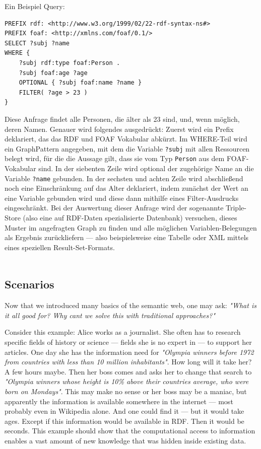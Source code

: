 Ein Beispiel Query:
\begin{lstlisting}[style=sparql]
PREFIX rdf: <http://www.w3.org/1999/02/22-rdf-syntax-ns#>
PREFIX foaf: <http://xmlns.com/foaf/0.1/>
SELECT ?subj ?name
WHERE {
    ?subj rdf:type foaf:Person .
    ?subj foaf:age ?age
    OPTIONAL { ?subj foaf:name ?name }
    FILTER( ?age > 23 )
}
\end{lstlisting}
Diese Anfrage findet alle Personen, die älter als 23 sind, und, wenn möglich, deren Namen. Genauer wird folgendes ausgedrückt: Zuerst wird ein Prefix deklariert, das das RDF und FOAF Vokabular abkürzt. 
Im WHERE-Teil wird ein GraphPattern angegeben, mit dem die Variable \texttt{?subj} mit allen Ressourcen belegt wird, für die die Aussage gilt, dass sie vom Typ \texttt{Person} aus dem FOAF-Vokabular sind. 
In der siebenten Zeile wird optional der zugehörige Name an die Variable \texttt{?name} gebunden. 
In der sechsten und achten Zeile wird abschließend noch eine Einschränkung auf das Alter deklariert, indem zunächst der Wert an eine Variable gebunden wird und diese dann mithilfe eines Filter-Ausdrucks eingeschränkt. 
Bei der Auswertung dieser Anfrage wird der sogenannte Triple-Store (also eine auf RDF-Daten spezialisierte Datenbank) versuchen, dieses Muster im angefragten Graph zu finden und alle möglichen Variablen-Belegungen als Ergebnis zurückliefern --- also beispielsweise eine Tabelle oder XML mittels eines speziellen Result-Set-Formats.\\
\\

\subsection{Scenarios}
Now that we introduced many basics of the semantic web, one may ask: \textit{"What is it all good for? Why cant we solve this with traditional approaches?"}

Consider this example: Alice works as a journalist. She often has to research specific fields of history or science --- fields she is no expert in --- to support her articles. One day she has the information need for \textit{"Olympia winners before 1972 from countries with less than 10 million inhabitants"}. How long will it take her? A few hours maybe. Then her boss comes and asks her to change that search to \textit{"Olympia winners whose height is 10\% above their countries average, who were born on Mondays"}. This may  make no sense or her boss may be a maniac, but apparently the information is available somewhere in the internet --- most probably even in Wikipedia alone. And one could find it --- but it would take ages. Except if this information would be available in RDF. Then it would be seconds. This example should show that the computational access to information enables a vast amount of new knowledge that was hidden inside existing data.

